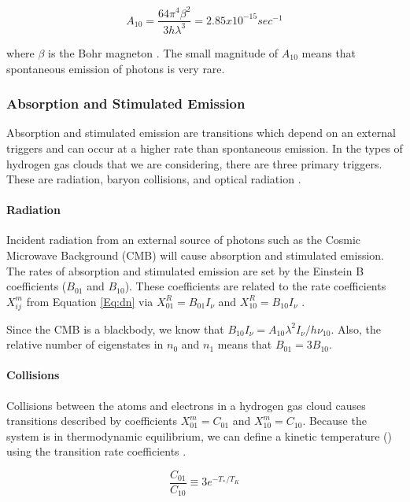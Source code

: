 \begin{equation}
A_{10} = \frac{64 \pi^4 \beta^2}{3 h \lambda^3} = 2.85 x 10^{-15} sec^{-1}
\end{equation}

where $\beta$ is the Bohr magneton \cite{field_1958}. The small magnitude of $A_{10}$ means that spontaneous emission of \cm photons is very rare. 

\subsubsection{Absorption and Stimulated Emission}
Absorption and stimulated emission are transitions which depend on an external triggers and can occur at a higher rate than spontaneous emission. In the types of hydrogen gas clouds that we are considering, there are three primary triggers. These are \cm radiation, baryon collisions, and optical radiation \cite{field_1958}. 

\paragraph{\cm Radiation}
Incident radiation from an external source of \cm photons such as the Cosmic Microwave Background (CMB) will cause absorption and stimulated emission. The rates of absorption and stimulated emission are set by the Einstein B coefficients ($B_{01}$ and $B_{10}$). These coefficients are related to the rate coefficients $X^{m}_{ij}$ from Equation \ref{Eq:dn} via  $X^R_{01} = B_{01} I_\nu$ and $X^R_{10} = B_{10} I_{\nu}$ \cite{field_1958}. 

Since the CMB is a blackbody, we know that $B_{10} I_{\nu} = A_{10} \lambda^2 I_{\nu}/ h \nu_{10}$. Also, the relative number of eigenstates in $n_0$ and $n_1$ means that $B_{01} = 3 B_{10}$. 


\paragraph{Collisions}
Collisions between the atoms and electrons in a hydrogen gas cloud causes transitions described by coefficients $X^m_{01} = C_{01}$ and $X^m_{10} = C_{10}$. Because the system is in thermodynamic equilibrium, we can define a kinetic temperature (\tk) using the transition rate coefficients \cite{field_1958}. 

\begin{equation}
\frac{C_{01}}{C_{10}} \equiv 3 e^{-T_*/T_K}
\end{equation}

